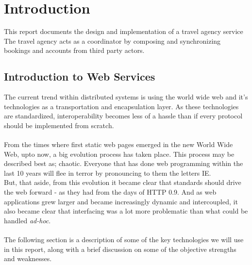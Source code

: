 \chapter{Introduction}
This report documents the design and implementation of a travel agency service The travel agency acts as a coordinator by composing and synchronizing bookings and accounts from third party actors.

\section{Introduction to Web Services}
The current trend within distributed systems is using the world wide web and it's technologies as a transportation and encapsulation layer. As these technologies are standardized, interoperability becomes less of a hassle than if every protocol should be implemented from scratch.\\\\
From the times where first static web pages emerged in the new World Wide Web, upto now, a big evolution process has taken place. This process may be described best as; chaotic. Everyone that has done web programming within the last 10 years will flee in terror by pronouncing to them the letters IE.\\
But, that aside, from this evolution it became clear that standards should drive the web forward - as they had from the days of HTTP 0.9. And as web applications grew larger and became increasingly dynamic and intercoupled, it also became clear that interfacing was a lot more problematic than what could be handled \emph{ad-hoc}.\\\\
The following section is a description of some of the key technologies we will use in this report, along with a brief discussion on some of the objective strengths and weaknesses.

